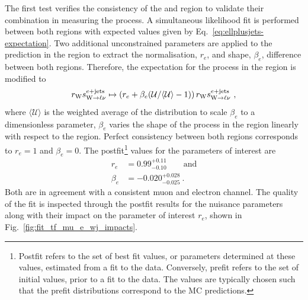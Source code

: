 The first test verifies the consistency of the \muplusjets and \eleplusjets
region to validate their combination in measuring the \IWj process. A
simultaneous likelihood fit is performed between both regions with expected
values given by Eq.~\ref{eq:ellplusjets-expectation}. Two additional
unconstrained parameters are applied to the \IWj prediction in the
\eleplusjets region to extract the normalisation, $r_e$, and shape, $\beta_e$,
difference between both regions. Therefore, the expectation for the \IWj
process in the \eleplusjets region is modified to
%
\begin{equation}
    r_{\PW}s_{\IWlv}^{\eleplusjets}\mapsto \left(r_e + \beta_{e}(\recoil/\langle\recoil\rangle-1)\right)r_{\PW}s_{\IWlv}^{\eleplusjets}\ ,
\end{equation}
%
where $\langle \mathcal{U} \rangle$ is the weighted average of the \recoil
distribution to scale $\beta_e$ to a dimensionless parameter, $\beta_e$ varies
the shape of the \IWj process in the \eleplusjets region linearly with respect
to the \muplusjets region. Perfect consistency between both regions
corresponds to $r_e=1$ and $\beta_e=0$. The postfit\footnote{Postfit refers to
the set of best fit values, or parameters determined at these values,
estimated from a fit to the data. Conversely, prefit refers to the set of
initial values, prior to a fit to the data. The values are typically chosen
such that the prefit distributions correspond to the MC predictions.} values
for the parameters of interest are
%
\begin{align}
    r_e & = 0.99^{+0.11}_{-0.10}\qquad \mathrm{and}\nonumber\\
    \beta_e & = -0.020^{+0.028}_{-0.025}\ .
\end{align}
%
Both are in agreement with a consistent muon and electron channel. The quality
of the fit is inspected through the postfit results for the nuisance
parameters along with their impact on the parameter of interest $r_e$, shown
in Fig.~\ref{fig:fit_tf_mu_e_wj_impacts}.
%
